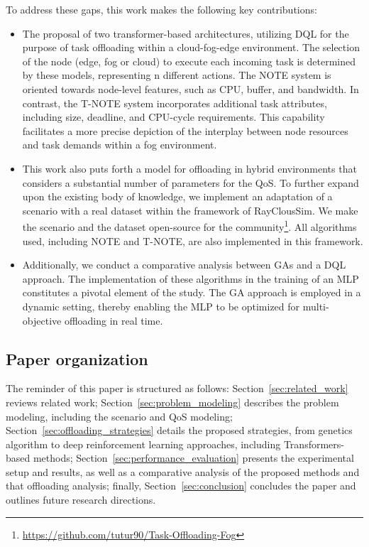 \documentclass[preprint,3p,authoryear]{elsarticle}
\begin{document}
To address these gaps, this work makes the following key contributions:
\begin{itemize} 
    \item The proposal of two transformer-based architectures, utilizing DQL for the purpose of task offloading within a cloud-fog-edge environment. The selection of the node (edge, fog or cloud) to execute each incoming task is determined by these models, representing n different actions. The NOTE system is oriented towards node-level features, such as CPU, buffer, and bandwidth. In contrast, the T-NOTE system incorporates additional task attributes, including size, deadline, and CPU-cycle requirements. This capability facilitates a more precise depiction of the interplay between node resources and task demands within a fog environment.

    \item This work also puts forth a model for offloading in hybrid environments that considers a substantial number of parameters for the QoS. To further expand upon the existing body of knowledge, we implement an adaptation of a scenario with a real dataset within the framework of RayClousSim. We make the scenario and the dataset open-source for the community\footnote{\url{https://github.com/tutur90/Task-Offloading-Fog}}. All algorithms used, including NOTE and T-NOTE, are also implemented in this framework.

    \item Additionally, we conduct a comparative analysis between GAs and a DQL approach. The implementation of these algorithms in the training of an MLP constitutes a pivotal element of the study. The GA approach is employed in a dynamic setting, thereby enabling the MLP to be optimized for multi-objective offloading in real time.
\end{itemize}


\subsection{Paper organization}

The reminder of this paper is structured as follows: Section~\ref{sec:related_work} reviews related work; Section~\ref{sec:problem_modeling} describes the problem modeling, including the scenario and QoS modeling; Section~\ref{sec:offloading_strategies} details the proposed strategies, from genetics algorithm to deep reinforcement learning approaches, including Transformers-based methods; Section~\ref{sec:performance_evaluation} presents the experimental setup and results, as well as a comparative analysis of the proposed methods and that offloading analysis; finally, Section~\ref{sec:conclusion} concludes the paper and outlines future research directions.
\end{document}
